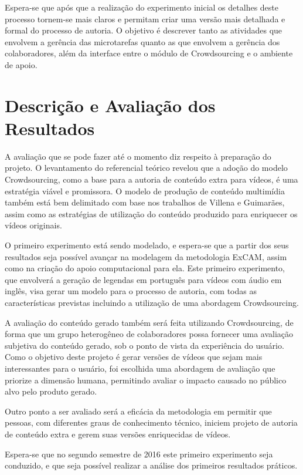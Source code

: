 \documentclass{sig-alternate}
\begin{document}
Espera-se que após que a realização do experimento inicial os detalhes deste processo tornem-se mais claros e permitam criar uma versão mais detalhada e formal do processo de autoria. O objetivo é descrever tanto as atividades que envolvem a gerência das microtarefas quanto as que envolvem a gerência dos colaboradores, além da interface entre o módulo de Crowdsourcing e o ambiente de apoio.



\section{Descrição e Avaliação dos Resultados}

\par A avaliação que se pode fazer até o momento diz respeito à preparação do projeto. O levantamento do referencial teórico revelou que a adoção do modelo Crowdsourcing, como a base para a autoria de conteúdo extra para vídeos, é uma estratégia viável e promissora. O modelo de produção de conteúdo multimídia também está bem delimitado com base nos trabalhos de Villena\cite{Villena2016} e Guimarães\cite{22334}, assim como as estratégias de utilização do conteúdo produzido para enriquecer os vídeos originais.

O primeiro experimento está sendo modelado, e espera-se que a partir dos seus resultados seja possível avançar na modelagem da metodologia ExCAM, assim como na criação do apoio computacional para ela. Este primeiro experimento, que envolverá a geração de legendas em português para vídeos com áudio em inglês, visa gerar um modelo para o processo de autoria, com todas as características previstas incluindo a utilização de uma abordagem Crowdsourcing.

A avaliação do conteúdo gerado também será feita utilizando Crowdsourcing, de forma que um grupo heterogêneo de colaboradores possa fornecer uma avaliação subjetiva do conteúdo gerado, sob o ponto de vista da experiência do usuário. Como o objetivo deste projeto é gerar versões de vídeos que sejam mais interessantes para o usuário, foi escolhida uma abordagem de avaliação que priorize a dimensão humana, permitindo avaliar o impacto causado no público alvo pelo produto gerado.

Outro ponto a ser avaliado será a eficácia da metodologia em permitir que pessoas, com diferentes graus de conhecimento técnico, iniciem projeto de autoria de conteúdo extra e gerem suas versões enriquecidas de vídeos.

Espera-se que no segundo semestre de 2016 este primeiro experimento seja conduzido, e que seja possível realizar a análise dos primeiros resultados práticos.



%

%
%

\end{document}
